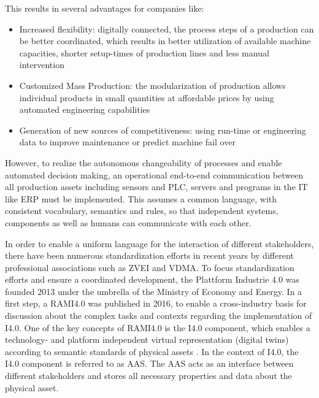 This results in several advantages for companies like:
\begin{itemize}
    \item Increased flexibility: digitally connected, the process steps of a production can be better coordinated, which results in better utilization of available machine capacities, shorter setup-times of production lines and less manual intervention
    \item Customized Mass Production: the modularization of production allows individual products in small quantities at affordable prices by using automated engineering capabilities
    \item Generation of new sources of competitiveness: using run-time or engineering data to improve maintenance or predict machine fail over
\end{itemize}

However, to realize the autonomous changeability of processes and enable automated decision making, an operational end-to-end communication between all production assets including sensors and \ac{PLC}, servers and programs in the IT like \ac{ERP} must be implemented. This assumes a common language, with consistent vocabulary, semantics and rules, so that independent systems, components as well as humans can communicate with each other.

In order to enable a uniform language for the interaction of different stakeholders, there have been numerous standardization efforts in recent years by different professional associations such as \ac{ZVEI} and \ac{VDMA}. To focus standardization efforts and ensure a coordinated development, the Plattform Industrie 4.0 was founded 2013 under the umbrella of the Ministry of Economy and Energy. In a first step, a \ac{RAMI4.0} was published in 2016, to enable a cross-industry basis for discussion about the complex tasks and contexts regarding the implementation of \ac{I4.0}. One of the key concepts of \ac{RAMI4.0} is the I4.0 component, which enables a technology- and platform independent virtual representation (digital twins) according to semantic standards of physical assets \cite{Heidel2017}. In the context of I4.0, the I4.0 component is referred to as \ac{AAS}. The \ac{AAS} acts as an interface between different stakeholders and stores all necessary properties and data about the physical asset.


